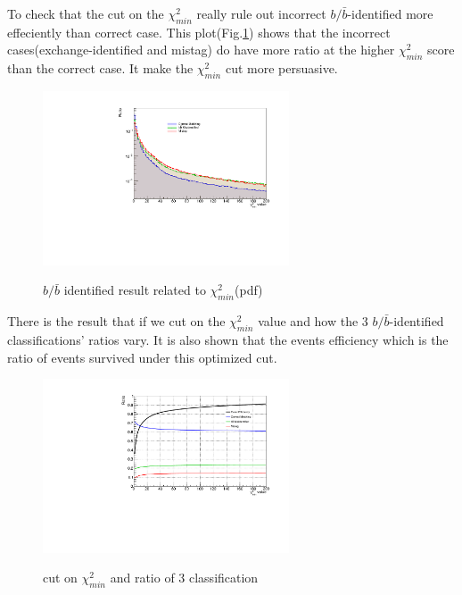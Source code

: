 		To check that the cut on the $\chi^2_{min}$ really rule out incorrect $b/\bar{b}$-identified more effeciently than correct case. This plot(Fig.\ref{EventSelReco:fig:chi2_bbsep_pdf}) shows that the incorrect cases(exchange-identified and mistag) do have more ratio at the higher $\chi^2_{min}$ score than the correct case. It make the $\chi^2_{min}$ cut more persuasive.

		\begin{figure}[H]
		\centering
		    \includegraphics[width=0.65\textwidth]{Figures/EventSelReco/bbsep/chi2_bbsep.pdf}\\
		\caption{$b/\bar{b}$ identified result related to $\chi^2_{min}$(pdf)}
		\label{EventSelReco:fig:chi2_bbsep_pdf}
		\end{figure}
		\FloatBarrier

		There is the result that if we cut on the $\chi^2_{min}$ value and how the 3 $b/\bar{b}$-identified classifications' ratios vary. It is also shown that the events efficiency which is the ratio of events survived under this optimized cut.

		\begin{figure}[H]
		\centering
		    \includegraphics[width=0.65\textwidth]{Figures/EventSelReco/bbsep/chi2_eff_t.pdf}\\ 
		\caption{cut on $\chi^2_{min}$ and ratio of 3 classification}
		\label{EventSelReco:fig:chi2_bbsep_eff}
		\end{figure}
		\FloatBarrier

